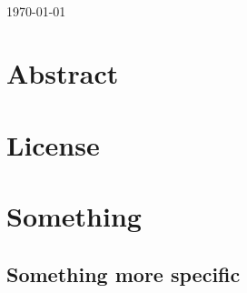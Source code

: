\documentclass[12pt]{memoir}
\begin{document}
\begin{titlingpage}
\begin{minipage}{0.4\textwidth}
\end{minipage}\\[2cm]



{\large \today}\\[2cm] %

\vfill %

\end{titlingpage}


\chapter{Abstract}
\lipsum[1]

\chapter{License}
\doclicenseThis{}




\cleardoublepage\tableofcontents

\cleardoublepage\listoftables

\cleardoublepage\listoffigures



\mainmatter{}

\chapter{Something}

\section{Something more specific}
\end{document}
